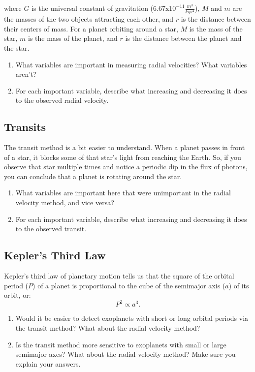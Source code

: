 \documentclass[12pt]{article}%
\begin{document}
\noindent where $G$ is the universal constant of gravitation ($6.67$x$10^{-11} \frac{m^3}{kg s^2}$), $M$ and $m$ are the masses of the two objects attracting each other, and $r$ is the distance between their centers of mass. For a planet orbiting around a star, $M$ is the mass of the star, $m$ is the mass of the planet, and $r$ is the distance between the planet and the star. 

\begin{enumerate}
    \item What variables are important in measuring radial velocities? What variables aren't? 
    \item For each important variable, describe what increasing and decreasing it does to the observed radial velocity.
\end{enumerate}

\subsection{Transits}

The transit method is a bit easier to understand. When a planet passes in front of a star, it blocks some of that star's light from reaching the Earth. So, if you observe that star multiple times and notice a periodic dip in the flux of photons, you can conclude that a planet is rotating around the star.
\begin{enumerate}
    \item What variables are important here that were unimportant in the radial velocity method, and vice versa?
    \item For each important variable, describe what increasing and decreasing it does to the observed transit. 
\end{enumerate}

\subsection{Kepler's Third Law}

Kepler's third law of planetary motion tells us that the square of the orbital period ($P$) of a planet is proportional to the cube of the semimajor axis ($a$) of its orbit, or:
\begin{equation*}
P^2 \propto a^3.
\end{equation*}
\begin{enumerate}
    \item Would it be easier to detect exoplanets with short or long orbital periods via the transit method? 
    What about the radial velocity method? 
    \item Is the transit method more sensitive to exoplanets with small or large semimajor axes? 
    What about the radial velocity method? Make sure you explain your answers.
\end{enumerate}
\end{document}
